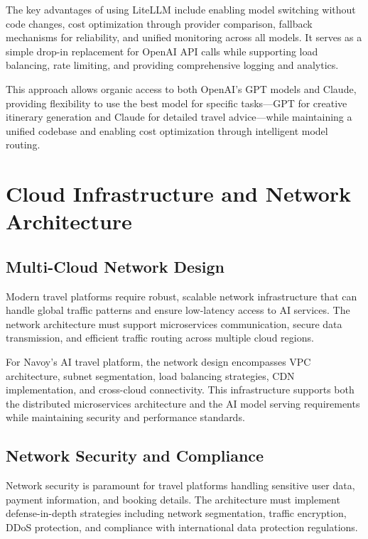 The key advantages of using LiteLLM include enabling model switching without code changes, cost optimization through provider comparison, fallback mechanisms for reliability, and unified monitoring across all models. It serves as a simple drop-in replacement for OpenAI API calls while supporting load balancing, rate limiting, and providing comprehensive logging and analytics.

This approach allows organic access to both OpenAI's GPT models and Claude, providing flexibility to use the best model for specific tasks—GPT for creative itinerary generation and Claude for detailed travel advice—while maintaining a unified codebase and enabling cost optimization through intelligent model routing.

\section{Cloud Infrastructure and Network Architecture}

\subsection{Multi-Cloud Network Design}
Modern travel platforms require robust, scalable network infrastructure that can handle global traffic patterns and ensure low-latency access to AI services. The network architecture must support microservices communication, secure data transmission, and efficient traffic routing across multiple cloud regions.

For Navoy's AI travel platform, the network design encompasses VPC architecture, subnet segmentation, load balancing strategies, CDN implementation, and cross-cloud connectivity. This infrastructure supports both the distributed microservices architecture and the AI model serving requirements while maintaining security and performance standards.

\subsection{Network Security and Compliance}
Network security is paramount for travel platforms handling sensitive user data, payment information, and booking details. The architecture must implement defense-in-depth strategies including network segmentation, traffic encryption, DDoS protection, and compliance with international data protection regulations.

